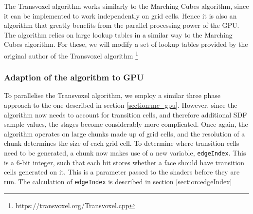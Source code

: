 \documentclass{article}
\begin{document}
The Transvoxel algorithm works similarly to the Marching Cubes algorithm, since it can be implemented to work independently on grid cells. Hence it is also an algorithm that greatly benefits from the parallel processing power of the GPU. The algorithm relies on large lookup tables in a similar way to the Marching Cubes algorithm. For these, we will modify a set of lookup tables provided by the original author of the Transvoxel algorithm \footnote{https://transvoxel.org/Transvoxel.cpp}
\subsubsection{Adaption of the algorithm to GPU}

To parallelise the Transvoxel algorithm, we employ a similar three phase approach to the one described in section \ref{section:mc_gpu}. However, since the algorithm now needs to account for transition cells, and therefore additional SDF sample values, the stages become considerably more complicated. Once again, the algorithm operates on large chunks made up of grid cells, and the resolution of a chunk determines the size of each grid cell. To determine where transition cells need to be generated, a chunk now makes use of a new variable, \texttt{edgeIndex}. This is a 6-bit integer, such that each bit stores whether a face should have transition cells generated on it. This is a parameter passed to the shaders before they are run. The calculation of \texttt{edgeIndex} is described in section \ref{section:edgeIndex}
\end{document}
